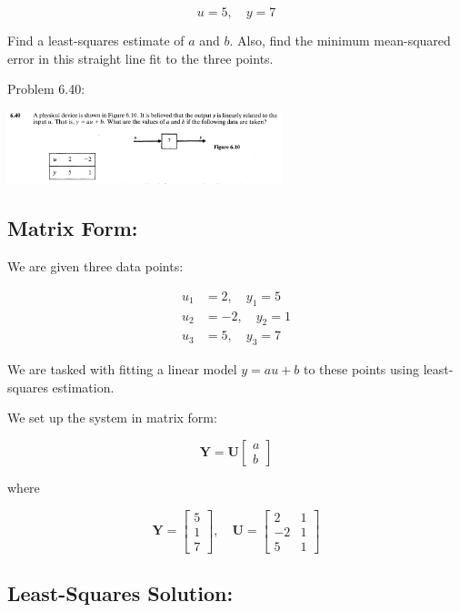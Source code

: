 \documentclass{article}
\begin{document}
\[
u = 5, \quad y = 7
\]

Find a least-squares estimate of \( a \) and \( b \). Also, find the minimum mean-squared error in this straight line fit to the three points.

Problem 6.40:

\begin{center}
\includegraphics[width=0.6\textwidth]{hw5q4p640.png}
\end{center}

\subsection{Matrix Form:}

We are given three data points:

\[
\begin{aligned}
u_1 &= 2, \quad y_1 = 5 \\
u_2 &= -2, \quad y_2 = 1 \\
u_3 &= 5, \quad y_3 = 7
\end{aligned}
\]

We are tasked with fitting a linear model \( y = a u + b \) to these points using least-squares estimation.

We set up the system in matrix form:

\[
\mathbf{Y} = \mathbf{U} \begin{bmatrix} a \\ b \end{bmatrix}
\]

where

\[
\mathbf{Y} = \begin{bmatrix} 5 \\ 1 \\ 7 \end{bmatrix}, \quad \mathbf{U} = \begin{bmatrix} 2 & 1 \\ -2 & 1 \\ 5 & 1 \end{bmatrix}
\]

\subsection{Least-Squares Solution:}
\end{document}
